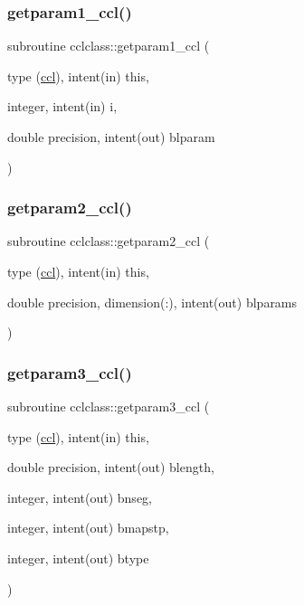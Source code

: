 \mbox{\label{namespacecclclass_a3cb17684a6eef64dd3c35cbb03bcb8b3}} 
\subsubsection{\texorpdfstring{getparam1\_ccl()}{getparam1\_ccl()}}
{\footnotesize\ttfamily subroutine cclclass\+::getparam1\+\_\+ccl (\begin{DoxyParamCaption}\item[{type (\mbox{\hyperlink{namespacecclclass_structcclclass_1_1ccl}{ccl}}), intent(in)}]{this,  }\item[{integer, intent(in)}]{i,  }\item[{double precision, intent(out)}]{blparam }\end{DoxyParamCaption})}

\mbox{\label{namespacecclclass_ad1c56a9447d1ff854afdc5502ae0fe18}} 
\subsubsection{\texorpdfstring{getparam2\_ccl()}{getparam2\_ccl()}}
{\footnotesize\ttfamily subroutine cclclass\+::getparam2\+\_\+ccl (\begin{DoxyParamCaption}\item[{type (\mbox{\hyperlink{namespacecclclass_structcclclass_1_1ccl}{ccl}}), intent(in)}]{this,  }\item[{double precision, dimension(\+:), intent(out)}]{blparams }\end{DoxyParamCaption})}

\mbox{\label{namespacecclclass_ad223096667fbe2e53bae56b52b2350fa}} 
\subsubsection{\texorpdfstring{getparam3\_ccl()}{getparam3\_ccl()}}
{\footnotesize\ttfamily subroutine cclclass\+::getparam3\+\_\+ccl (\begin{DoxyParamCaption}\item[{type (\mbox{\hyperlink{namespacecclclass_structcclclass_1_1ccl}{ccl}}), intent(in)}]{this,  }\item[{double precision, intent(out)}]{blength,  }\item[{integer, intent(out)}]{bnseg,  }\item[{integer, intent(out)}]{bmapstp,  }\item[{integer, intent(out)}]{btype }\end{DoxyParamCaption})}

